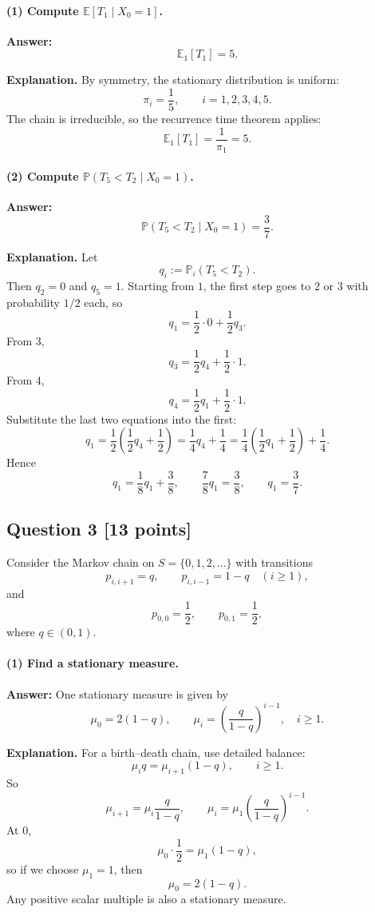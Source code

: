 \documentclass[11pt]{article}
\theoremstyle{definition}
\begin{document}
\paragraph{(1) Compute $\mathbb E[T_1\mid X_0=1]$.}
\textbf{Answer:}
\[
\mathbb E_1[T_1]=5.
\]

\textbf{Explanation.} By symmetry, the stationary distribution is uniform:
\[
\pi_i=\frac15, \qquad i=1,2,3,4,5.
\]
The chain is irreducible, so the recurrence time theorem applies:
\[
\mathbb E_1[T_1]=\frac{1}{\pi_1}=5.
\]

\paragraph{(2) Compute $\mathbb P(T_5<T_2\mid X_0=1)$.}
\textbf{Answer:}
\[
\mathbb P(T_5<T_2\mid X_0=1)=\frac37.
\]

\textbf{Explanation.} Let
\[
q_i:=\mathbb P_i(T_5<T_2).
\]
Then $q_2=0$ and $q_5=1$. Starting from $1$, the first step goes to $2$ or $3$ with probability $1/2$ each, so
\[
q_1=\frac12\cdot 0 + \frac12 q_3.
\]
From $3$,
\[
q_3=\frac12 q_4 + \frac12\cdot 1.
\]
From $4$,
\[
q_4=\frac12 q_1 + \frac12\cdot 1.
\]
Substitute the last two equations into the first:
\[
q_1=\frac12\left(\frac12 q_4 + \frac12\right)
=\frac14 q_4 + \frac14
=\frac14\left(\frac12 q_1+\frac12\right)+\frac14.
\]
Hence
\[
q_1=\frac18 q_1 + \frac38,
\qquad
\frac78 q_1=\frac38,
\qquad
q_1=\frac37.
\]

\subsection*{Question 3 \hfill [13 points]}
Consider the Markov chain on $S=\{0,1,2,\dots\}$ with transitions
\[
 p_{i,i+1}=q,
 \qquad
 p_{i,i-1}=1-q
 \quad (i\ge 1),
\]
and
\[
 p_{0,0}=\frac12,
 \qquad
 p_{0,1}=\frac12,
\]
where $q\in(0,1)$.

\paragraph{(1) Find a stationary measure.}
\textbf{Answer:} One stationary measure is given by
\[
\mu_0=2(1-q),
\qquad
\mu_i=\left(\frac{q}{1-q}\right)^{i-1}, \quad i\ge 1.
\]

\textbf{Explanation.} For a birth--death chain, use detailed balance:
\[
\mu_i q = \mu_{i+1}(1-q), \qquad i\ge 1.
\]
So
\[
\mu_{i+1}=\mu_i\frac{q}{1-q},
\qquad
\mu_i=\mu_1\left(\frac{q}{1-q}\right)^{i-1}.
\]
At $0$,
\[
\mu_0\cdot \frac12 = \mu_1(1-q),
\]
so if we choose $\mu_1=1$, then
\[
\mu_0=2(1-q).
\]
Any positive scalar multiple is also a stationary measure.
\end{document}
